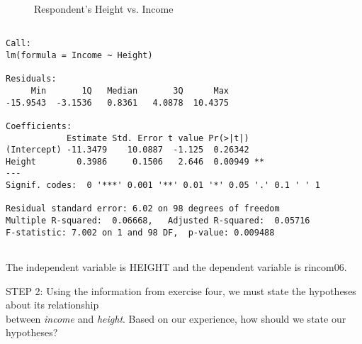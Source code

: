 \documentclass[11pt]{book}\usepackage[]{graphicx}\usepackage[]{color}
\begin{document}
\begin{exercises}
\begin{exercise}
\begin{figure}[ht]
{}

\caption[Respondent's Height vs]{Respondent's Height vs. Income}\label{fig:LBL16h}
\end{figure}



{\tiny{
  \begin{verbatim}

Call:
lm(formula = Income ~ Height)

Residuals:
     Min       1Q   Median       3Q      Max 
-15.9543  -3.1536   0.8361   4.0878  10.4375 

Coefficients:
            Estimate Std. Error t value Pr(>|t|)   
(Intercept) -11.3479    10.0887  -1.125  0.26342   
Height        0.3986     0.1506   2.646  0.00949 **
---
Signif. codes:  0 '***' 0.001 '**' 0.01 '*' 0.05 '.' 0.1 ' ' 1

Residual standard error: 6.02 on 98 degrees of freedom
Multiple R-squared:  0.06668,	Adjusted R-squared:  0.05716 
F-statistic: 7.002 on 1 and 98 DF,  p-value: 0.009488


  \end{verbatim}
}}

    \vspace{5mm}

    \end{exercise}
    \begin{solution}    %

       The independent variable is HEIGHT and the dependent variable is rincom06.

    \end{solution}

  \begin{exercise} %

    STEP 2: Using the information from exercise four, we must state the hypotheses about its relationship \\ between {\textit{income}} and {\textit{height}}.  Based on our experience, how should we state our hypotheses?

    \vspace{5mm}

    \end{exercise}

  \begin{exercise} %


\end{exercise}
\end{exercises}
\end{document}
